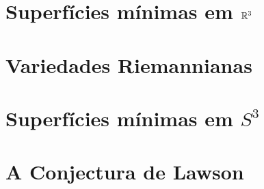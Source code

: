 \documentclass[mestrado, pre-defesa]{packages/icmc}
\begin{document}
\textual

\newcommand{\comando}[1]{\textbf{$\backslash$#1}}



%
%

\chapter{Superfícies mínimas em $\mathbb{R}^3$}
\label{chapter:superficies-minimas-em-R3}


\chapter{Variedades Riemannianas}
\label{chapter:variedades-riemannianas}





\chapter{Superfícies mínimas em $S^3$}
\label{chapter:superficies-minimas-em-S3}


\chapter{A Conjectura de Lawson}
\label{chapter:prova-da-conjetura-de-lawson}

\end{document}
